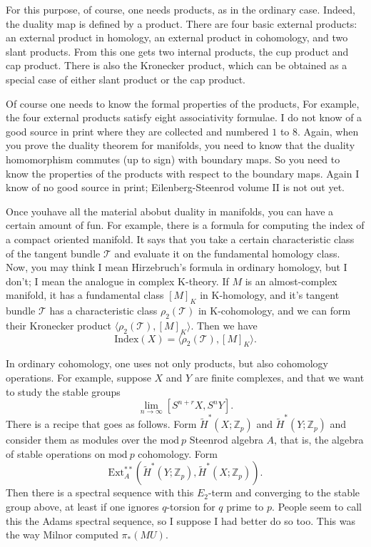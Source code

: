 \documentclass[../main]{subfiles}
\begin{document}
For this purpose, of course, one needs products, as in the ordinary case. Indeed, the duality map is defined by a product. There are four basic external products: an external product in homology, an external product in cohomology, and two slant products. From this one gets two internal products, the cup product and cap product. There is also the Kronecker product, which can be obtained as a special case of either slant product or the cap product.

Of course one needs to know the formal properties of the products, For example, the four external products satisfy eight associativity formulae. I do not know of a good source in print where they are collected and numbered $1$ to $8$. Again, when you prove the duality theorem for manifolds, you need to know that the duality homomorphism commutes (up to sign) with boundary maps. So you need to know the properties of the products with respect to the boundary maps. Again I know of no good source in print; Eilenberg-Steenrod volume II is not out yet.

Once youhave all the material abobut duality in manifolds, you can have a certain amount of fun. For example, there is a formula for computing the index of a compact oriented manifold. It says that you take a certain characteristic class of the tangent bundle $\mathcal{T}$ and evaluate it on the fundamental homology class. Now, you may think I mean Hirzebruch's formula in ordinary homology, but I don't; I mean the analogue in complex K-theory. If $M$ is an almost-complex manifold, it has a fundamental class $[M]_K$ in K-homology, and it's tangent bundle $\mathcal T$ has a characteristic class $\rho_2(\mathcal T)$ in K-cohomology, and we can form their Kronecker product $\langle \rho_2(\mathcal T), [M]_K \rangle$.  Then we have
\[ \mathrm{Index}(X) = \langle \rho_2(\mathcal T), [M]_K \rangle. \]

In ordinary cohomology, one uses not only products, but also cohomology operations. For example, suppose $X$ and $Y$ are finite complexes, and that we want to study the stable groups 
\[ \lim_{n \to \infty} [S^{n + r}X, S^nY]. \]
There is a recipe that goes as follows. Form $\tilde H^*(X; \mathbb Z_p)$ and $\tilde H^*(Y; \mathbb Z_p)$ and consider them as modules over the $\mathrm{mod}\ p$ Steenrod algebra $A$, that is, the algebra of stable operations on $\mathrm{mod}\ p$ cohomology. Form 
\[ \mathrm{Ext}_A^{**}\left(\tilde H^*(Y; \mathbb Z_p), \tilde H^*(X; \mathbb Z_p)\right). \]
Then there is a spectral sequence with this $E_2$-term and converging to the stable group above, at least if one ignores $q$-torsion for $q$ prime to $p$. People seem to call this the Adams spectral sequence, so I suppose I had better do so too. This was the way Milnor computed $\pi_*(MU)$.
\end{document}
